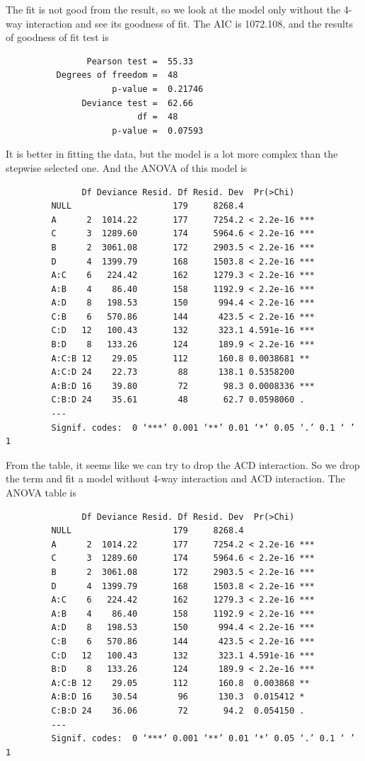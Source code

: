 \documentclass{article}
\begin{document}
    The fit is not good from the result, so we look at the model only without the 4-way interaction and see its goodness of fit. The AIC is 1072.108, and the results of goodness of fit test is
    \begin{verbatim}
                Pearson test =  55.33
          Degrees of freedom =  48
                     p-value =  0.21746
               Deviance test =  62.66
                          df =  48
                     p-value =  0.07593 
    \end{verbatim}

    It is better in fitting the data, but the model is a lot more complex than the stepwise selected one. And the ANOVA of this model is
             \begin{verbatim}
               Df Deviance Resid. Df Resid. Dev  Pr(>Chi)    
         NULL                    179     8268.4              
         A      2  1014.22       177     7254.2 < 2.2e-16 ***
         C      3  1289.60       174     5964.6 < 2.2e-16 ***
         B      2  3061.08       172     2903.5 < 2.2e-16 ***
         D      4  1399.79       168     1503.8 < 2.2e-16 ***
         A:C    6   224.42       162     1279.3 < 2.2e-16 ***
         A:B    4    86.40       158     1192.9 < 2.2e-16 ***
         A:D    8   198.53       150      994.4 < 2.2e-16 ***
         C:B    6   570.86       144      423.5 < 2.2e-16 ***
         C:D   12   100.43       132      323.1 4.591e-16 ***
         B:D    8   133.26       124      189.9 < 2.2e-16 ***
         A:C:B 12    29.05       112      160.8 0.0038681 ** 
         A:C:D 24    22.73        88      138.1 0.5358200    
         A:B:D 16    39.80        72       98.3 0.0008336 ***
         C:B:D 24    35.61        48       62.7 0.0598060 .  
         ---
         Signif. codes:  0 ‘***’ 0.001 ‘**’ 0.01 ‘*’ 0.05 ‘.’ 0.1 ‘ ’ 1
             \end{verbatim}
    From the table, it seems like we can try to drop the ACD interaction. So we drop the term and fit a model without 4-way interaction and ACD interaction. The ANOVA table is
    \begin{verbatim}
               Df Deviance Resid. Df Resid. Dev  Pr(>Chi)    
         NULL                    179     8268.4              
         A      2  1014.22       177     7254.2 < 2.2e-16 ***
         C      3  1289.60       174     5964.6 < 2.2e-16 ***
         B      2  3061.08       172     2903.5 < 2.2e-16 ***
         D      4  1399.79       168     1503.8 < 2.2e-16 ***
         A:C    6   224.42       162     1279.3 < 2.2e-16 ***
         A:B    4    86.40       158     1192.9 < 2.2e-16 ***
         A:D    8   198.53       150      994.4 < 2.2e-16 ***
         C:B    6   570.86       144      423.5 < 2.2e-16 ***
         C:D   12   100.43       132      323.1 4.591e-16 ***
         B:D    8   133.26       124      189.9 < 2.2e-16 ***
         A:C:B 12    29.05       112      160.8  0.003868 ** 
         A:B:D 16    30.54        96      130.3  0.015412 *  
         C:B:D 24    36.06        72       94.2  0.054150 .  
         ---
         Signif. codes:  0 ‘***’ 0.001 ‘**’ 0.01 ‘*’ 0.05 ‘.’ 0.1 ‘ ’ 1
    \end{verbatim}
\end{document}
